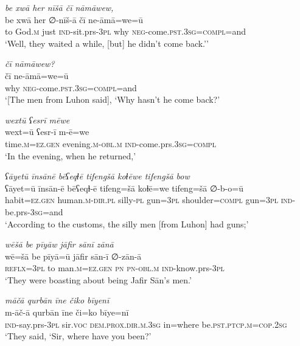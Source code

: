 \ea \label{ŠJ.25}
\textit{be xwā her nīšā čī nāmāwew,} \\ 
\gll be xwā her ∅-nīš-ā čī ne-āmā=we=ū \\ 
 to God\textsc{.m} just \textsc{ind-}sit.prs\textsc{-3pl} why \textsc{neg-}come\textsc{.pst}\textsc{.3sg}\textsc{=compl}=and \\ 
\glt `Well, they waited a while, [but] he didn’t come back.’'
\z 
 
\ea \label{ŠJ.26}
\textit{čī nāmāwew?} \\ 
\gll čī ne-āmā=we=ū \\ 
 why \textsc{neg-}come\textsc{.pst}\textsc{.3sg}\textsc{=compl}=and \\ 
\glt `[The men from Luhon said], ‘Why hasn’t he come back?'
\z 
 
\ea \label{ŠJ.27}
\textit{wextū ʕesrī mēwe} \\ 
\gll wext=ū ʕesr-ī m-ē=we \\ 
 time\textsc{.m}\textsc{=ez.gen} evening\textsc{.m}\textsc{-obl}\textsc{.m} \textsc{ind-}come.prs\textsc{.3sg}\textsc{=compl} \\ 
\glt `In the evening, when he returned,'
\z 
 
\ea \label{ŠJ.28}
\textit{ʕāyetū īnsānē bēʕeqɫē tifengšā koɫēwe tifengšā bow} \\ 
\gll ʕāyet=ū īnsān-ē bēʕeqɫ-ē tifeng=šā koɫē=we tifeng=šā ∅-b-o=ū \\ 
 habit\textsc{=ez.gen} human\textsc{.m}\textsc{-dir}\textsc{.pl} silly\textsc{\textsc{-pl}} gun\textsc{=3pl} shoulder\textsc{=compl} gun\textsc{=3pl} \textsc{ind-}be.prs\textsc{-3sg}=and \\ 
\glt `According to the customs, the silly men [from Luhon] had guns;'
\z 
 
\ea \label{ŠJ.29}
\textit{wēšā be pīyāw jāfir sānī zānā} \\ 
\gll wē=šā be pīyā=ū jāfir sān-ī ∅-zān-ā \\ 
 \textsc{reflx}\textsc{=3pl} to man\textsc{.m}\textsc{=ez.gen} \textsc{pn} \textsc{pn}\textsc{-obl}\textsc{.m} \textsc{ind-}know.prs\textsc{-3pl} \\ 
\glt `They were boasting about being Jafir Sān’s men.'
\z 
 
\ea \label{ŠJ.30}
\textit{māčā qurbān īne čiko bīyenī} \\ 
\gll m-āč-ā qurbān īne či=ko bīye=nī \\ 
 \textsc{ind-}say.prs\textsc{-3pl} sir.\textsc{voc} \textsc{dem.prox}\textsc{.dir}\textsc{.m}\textsc{.3sg} in=where be\textsc{.pst}\textsc{.ptcp}\textsc{.m}\textsc{=cop}\textsc{.\textsc{2sg}} \\ 
\glt `They said, ‘Sir, where have you been?'
\z 
 
